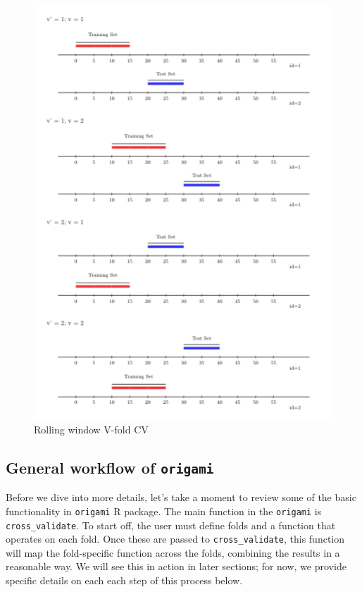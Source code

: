 \documentclass[12pt, krantz2,]{krantz}
\theoremstyle{definition}
\theoremstyle{definition}
\theoremstyle{definition}
\newcommand{\1}{\mathbbm{1}}
\begin{document}
\begin{figure}

{\centering \includegraphics[width=0.8\linewidth]{img/image/rolling_window_v_fold} 

}

\caption{Rolling window V-fold CV}\label{fig:unnamed-chunk-4}
\end{figure}

\hypertarget{general-workflow-of-origami}{%
\subsection{\texorpdfstring{General workflow of \texttt{origami}}{General workflow of origami}}\label{general-workflow-of-origami}}

Before we dive into more details, let's take a moment to review some of the
basic functionality in \texttt{origami} R package. The main function in the \texttt{origami}
is \texttt{cross\_validate}. To start off, the user must define folds and a function
that operates on each fold. Once these are passed to \texttt{cross\_validate}, this
function will map the fold-specific function across the folds, combining the
results in a reasonable way. We will see this in action in later sections; for
now, we provide specific details on each each step of this process below.
\end{document}
